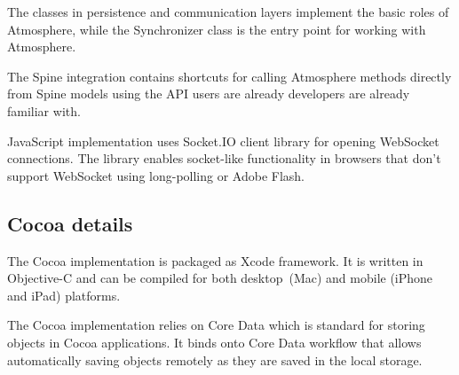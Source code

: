 The classes in persistence and communication layers implement the basic roles of Atmosphere, while the Synchronizer class is the entry point for working with Atmosphere.

The Spine integration contains shortcuts for calling Atmosphere methods directly from Spine models using the API users are already developers are already familiar with.

JavaScript implementation uses Socket.IO \citep{socketio} client library for opening WebSocket connections. The library enables socket-like functionality in browsers that don't support WebSocket using long-polling or Adobe Flash.

\subsection{Cocoa details}

The Cocoa implementation is packaged as Xcode framework. It is written in Objective-C and can be compiled for both desktop (Mac) and mobile (iPhone and iPad) platforms.

The Cocoa implementation relies on Core Data which is standard for storing objects in Cocoa applications. It binds onto Core Data workflow that allows automatically saving objects remotely as they are saved in the local storage.